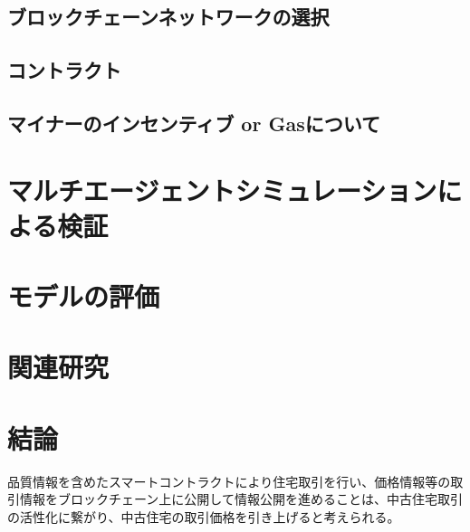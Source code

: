 \documentclass[a4paper,10.5pt]{jlreq}
\begin{document}
\subsection{ブロックチェーンネットワークの選択}


\subsection{コントラクト}

\subsection{マイナーのインセンティブ or Gasについて}

\section{マルチエージェントシミュレーションによる検証}
\section{モデルの評価}
\section{関連研究}
\section{結論}
品質情報を含めたスマートコントラクトにより住宅取引を行い、価格情報等の取引情報をブロックチェーン上に公開して情報公開を進めることは、中古住宅取引の活性化に繋がり、中古住宅の取引価格を引き上げると考えられる。



\end{document}
